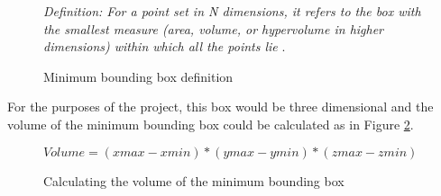 \begin{figure}[h]
\textit{Definition: For a point set in N dimensions, it refers to the box with the smallest measure (area, volume, or hypervolume in higher dimensions) within which all the points lie} \cite{Barequet2001}.
\caption {Minimum bounding box definition}
\label{fig:bounding_box_definition}
\end{figure}

For the purposes of the project, this box would be three dimensional and the volume of the minimum bounding box could be calculated as in Figure \ref{fig:calculating_the_volume_of_the_minimum_bounding_box}.\\

\begin{figure}[h]
\begin{center}
$Volume = (xmax -xmin) * (ymax - ymin) * (zmax - zmin)$
\end{center}
\caption{Calculating the volume of the minimum bounding box}
\label{fig:calculating_the_volume_of_the_minimum_bounding_box}
\end{figure}


